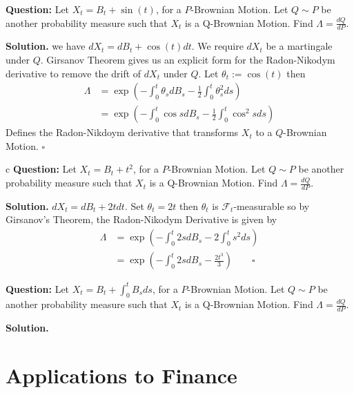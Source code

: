 \documentclass{article}
\begin{document}
\begin{tcolorbox}[colframe=black,colback=gray!5,boxrule=0.5pt]
\textbf{Question:} Let $X_t = B_t + \sin(t)$, for a $P$-Brownian Motion. Let $Q\sim P$ be another probability measure such that $X_t$ is a Q-Brownian Motion. Find $\Lambda = \frac{dQ}{dP}$.
\end{tcolorbox}
\textbf{Solution.} we have $dX_t = dB_t + \cos(t)dt$. We require $dX_t$ be a martingale under $Q$. Girsanov Theorem gives us an explicit form for the Radon-Nikodym derivative to remove the drift of $dX_t$ under $Q$. Let $\theta _t := \cos(t)$ then 
\begin{align*}
    \Lambda &= \exp\left(-\int_0^t\theta_sdB_s - \frac{1}{2}\int_0^t\theta_s^2ds\right) \\
    &= \exp\left(-\int_0^t \cos sdB_s - \frac{1}{2}\int_0^t\cos^2s ds\right)
\end{align*}
Defines the Radon-Nikdoym derivative that transforms $X_t$ to a $Q$-Brownian Motion. $\square$

\begin{tcolorbox}[colframe=black,colback=gray!5,boxrule=0.5pt]
c \textbf{Question:} Let $X_t = B_t + t^2$, for a $P$-Brownian Motion. Let $Q\sim P$ be another probability measure such that $X_t$ is a Q-Brownian Motion. Find $\Lambda = \frac{dQ}{dP}$.
\end{tcolorbox}
\textbf{Solution.} $dX_t = dB_t + 2tdt$. Set $\theta_t = 2t$ then $\theta_t$ is $\mathcal{F}_t$-measurable so by Girsanov's Theorem, the Radon-Nikodym Derivative is given by 
\begin{align*}
    \Lambda &= \exp\left(-\int_0^t2sdB_s - 2\int_0^ts^2ds\right) \\
    &= \exp\left(-\int_0^t2sdB_s - \frac{2t^3}{3}\right) \quad\quad\square
\end{align*}

\begin{tcolorbox}[colframe=black,colback=gray!5,boxrule=0.5pt]
\textbf{Question:} Let $X_t = B_t + \int_0^t B_sds$, for a $P$-Brownian Motion. Let $Q\sim P$ be another probability measure such that $X_t$ is a Q-Brownian Motion. Find $\Lambda = \frac{dQ}{dP}$.
\end{tcolorbox}
\textbf{Solution.}




\newpage
\section{Applications to Finance}
\end{document}
